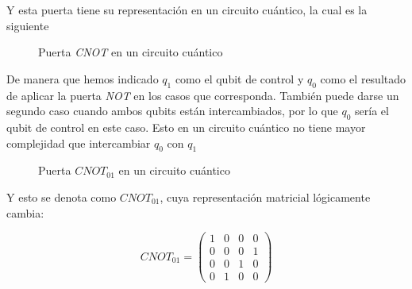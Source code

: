 \documentclass{article}
\numberwithin{equation}{section} %
\begin{document}
    Y esta puerta tiene su representación en un circuito cuántico, la cual es la siguiente

    \vspace{5mm}

    \begin{figure}[!h]
        \centering
        \caption{Puerta \textit{CNOT} en un circuito cuántico}
        \label{fig:puerta_cnot_circuito_cuantico}
    \end{figure}
    
    

    \vspace{2.5mm}

    De manera que hemos indicado \( q_{1} \) como el qubit de control y \( q_{0} \) como el resultado de aplicar la puerta \textit{NOT} en los casos que corresponda. También puede darse un segundo caso cuando ambos qubits están intercambiados, por lo que \( q_{0} \) sería el qubit de control en este caso. Esto en un circuito cuántico no tiene mayor complejidad que intercambiar \( q_{0} \) con \( q_{1} \)

    \vspace{5mm}

    \begin{figure}[!h]
        \centering
        \caption{Puerta \(\textit{CNOT}_{01} \) en un circuito cuántico}
        \label{fig: puerta_cnot_01_circuito_cuantico}
    \end{figure}

    \vspace{2.5mm}

    Y esto se denota como \(\textit{CNOT}_{01} \), cuya representación matricial lógicamente cambia:

    \begin{equation}
        \textit{CNOT}_{01} = \begin{pmatrix}
            1 & 0 & 0 & 0 \\
            0 & 0 & 0 & 1 \\
            0 & 0 & 1 & 0 \\
            0 & 1 & 0 & 0
        \end{pmatrix}
    \end{equation}
\end{document}
